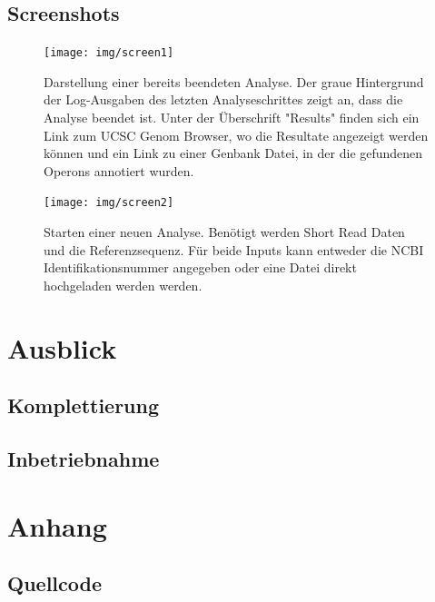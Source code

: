 \documentclass[a4paper]{thesis}
\begin{document}
\subsection{Screenshots}

\begin{figure}[h]
	\texttt{[image: img/screen1]}
	\label{fig:screen1}
	\caption[Screenshot 1]{
	Darstellung einer bereits beendeten Analyse. Der graue Hintergrund
	der Log-Ausgaben des letzten Analyseschrittes zeigt an, dass die
	Analyse beendet ist. Unter der Überschrift "Results" finden sich
	ein Link zum UCSC Genom Browser, wo die Resultate angezeigt werden
	können und ein Link zu einer Genbank Datei, in der die gefundenen
	Operons annotiert wurden.
	}
\end{figure}

\begin{figure}[h]
\texttt{[image: img/screen2]}
\label{fig:screen2}
\caption[Screenshot 2]{
	Starten einer neuen Analyse. Benötigt werden Short Read Daten und
	die Referenzsequenz. Für beide Inputs kann entweder die NCBI
	Identifikationsnummer angegeben oder eine Datei direkt
	hochgeladen werden werden.
}
\end{figure}

\section{Ausblick}

\subsection{Komplettierung}

\subsection{Inbetriebnahme}

\newpage
\section{Anhang}

\subsection{Quellcode}

\renewcommand\stctitle{Inhalt}
\secttoc
\end{document}
